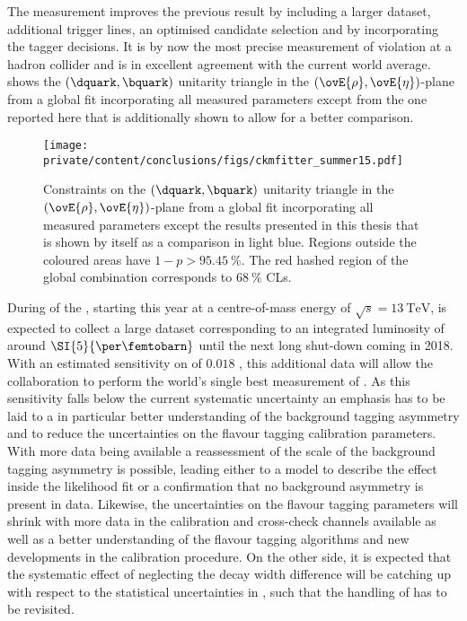 The measurement improves the previous \LHCb result \cite{Aaij:1497268} by
including a larger dataset, additional trigger lines, an optimised candidate
selection and by incorporating the \SSpi tagger decisions. It is by now the most
precise measurement of \CP violation at a hadron collider and is in excellent
agreement with the current world average.
 shows the ${(\dquark,\bquark)}$ unitarity
triangle in the ${(\ovE{\rho},\ovE{\eta})}$-plane from a global fit
incorporating all measured
\CKM parameters \cite{Charles:2004jd} except from the one reported here that is
additionally shown to allow for a better comparison.
%
\begin{figure}[ht]
\centering
\texttt{[image: private/content/conclusions/figs/ckmfitter\_summer15.pdf]}
\caption{Constraints on the ${(\dquark,\bquark)}$ unitarity triangle in the
${(\ovE{\rho},\ovE{\eta})}$-plane from a global fit incorporating all measured
\CKM parameters except the results presented in this thesis that is shown by
itself as a comparison in light blue. Regions outside the coloured areas have
$1-p > \SI{95.45}{\percent}$. The red hashed region of the global combination
corresponds to $\SI{68}{\percent}$ \acp{CL}. \cite{Charles:2004jd}}
\label{fig:conclusion:ckm_fitter_15}
\end{figure}

During \RunTwo of the \LHC, starting this year at a centre-of-mass energy of
$\sqrt{s} = \SI{13}{\TeV}$, \LHCb is expected to collect a large dataset
corresponding to an integrated luminosity of around $\SI{5}{\per\femtobarn}$
until the next long shut-down coming in 2018. With an estimated sensitivity on
\SJpsiKS of $\num{0.018}$ \cite{Moedden:2015}, this additional data will allow
the \LHCb collaboration to perform the world's single best measurement of
\sintwobeta. As this sensitivity falls below the current systematic uncertainty
an emphasis has to be laid to a in particular better understanding of the
background tagging asymmetry and to reduce the uncertainties on the flavour
tagging calibration parameters. With more data being available a reassessment of
the scale of the background tagging asymmetry is possible, leading either to a
model to describe the effect inside the likelihood fit or a confirmation that no
background asymmetry is present in data. Likewise, the uncertainties on the
flavour tagging parameters will shrink with more data in the calibration and
cross-check channels available as well as a better understanding of the flavour
tagging algorithms and new developments in the calibration procedure. On the
other side, it is expected \cite{Moedden:2015} that the systematic effect of
neglecting the decay width difference \DGd will be catching up with respect to
the statistical uncertainties in \RunTwo, such that the handling of \DGd has to
be revisited.

